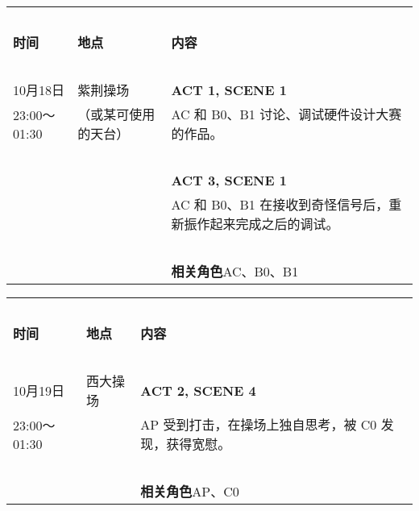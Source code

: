 \documentclass[10pt, a5paper, oneside]{memoir}
\begin{document}
\begin{table}[!ht]
    \raggedright
    \begin{tabular}{p{}p{}p{}}
        \toprule
        ~ & & \\[-0.7em]
        \textbf{时间} & \textbf{地点} & \textbf{内容} \\[0.3em]
        \midrule
        ~ & & \\[-0.7em]
        10月18日        & 紫荆操场 & \textbf{ACT 1, SCENE 1} \\[0.3em]
        23:00～01:30    & （或某可使用的天台） & 
            AC 和 B0、B1 讨论、调试硬件设计大赛的作品。
        \\
        ~ & & \\[-0.7em]
        ~ & ~ & \textbf{ACT 3, SCENE 1} \\[0.3em]
        ~ & ~ & 
            AC 和 B0、B1 在接收到奇怪信号后，重新振作起来完成之后的调试。
        \\
        ~ & & \\[-0.7em]
        ~ & ~ & \textbf{相关角色\quad}AC、B0、B1 \\[0.3em]
        \bottomrule
    \end{tabular}
\end{table}

\begin{table}[!ht]
    \raggedright
    \begin{tabular}{p{}p{}p{}}
        \toprule
        ~ & & \\[-0.7em]
        \textbf{时间} & \textbf{地点} & \textbf{内容} \\[0.3em]
        \midrule
        ~ & & \\[-0.7em]
        10月19日        & 西大操场 & \textbf{ACT 2, SCENE 4} \\[0.3em]
        23:00～01:30    & ~ & 
            AP 受到打击，在操场上独自思考，被 C0 发现，获得宽慰。
        \\
        ~ & & \\[-0.7em]
        ~ & ~ & \textbf{相关角色\quad}AP、C0 \\[0.3em]
        \bottomrule
    \end{tabular}
\end{table}
\end{document}

